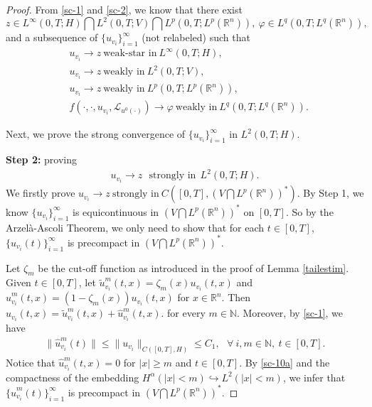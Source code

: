 \documentclass[11pt]{article}
\numberwithin{equation}{section}
\theoremstyle{plain}
\def\geq{\geqslant}
\def\leq{\leqslant}
\begin{document}
\begin{proof}
    From \eqref{sc-1} and \eqref{sc-2},
    we   know that there exist
    $$
    z \in L^\infty(0,T; H) \bigcap L^2(0,T; V) \bigcap L^p(0,T; L^p(\mathbb{R}^n) ),\
    \varphi \in L^q(0,T; L^q(\mathbb{R}^n) ),
    $$
    and a  subsequence of $\{ u_{v_i} \}_{i=1}^\infty$ (not relabeled)
    such that
    \begin{align}
        & u_{v_i} \rightarrow z \  \text{weak-star in} \  L^\infty(0,T; H),  \label{uws} \\
        & u_{v_i} \rightarrow z \  \text{weakly in} \  L^2(0,T; V),  \label{uw} \\
        & u_{v_i} \rightarrow z \  \text{weakly in} \  L^p(0,T; L^p(\mathbb{R}^n) ),  \label{uwlp} \\
        & f(\cdot, \cdot, u_{v_i}, \mathcal{L}_{u^0(\cdot)} ) \rightarrow \varphi \  \text{weakly in} \  L^q(0,T; L^q(\mathbb{R}^n) ).  \label{fw}
    \end{align}

    Next, we prove the strong convergence
    of $\{u_{v_i}\}_{i=1}^\infty$ in
    $ L^2(0,T; H)$.

    {\bf Step 2:}  proving
    \begin{align} \label{sc-10}
        u_{v_i} \rightarrow  z  \ \ \  \text{strongly in} \ \  L^2(0,T; H).
    \end{align}
    We  firstly prove
    $u_{v_i} \rightarrow z \
    \text{strongly in} \  C \left([0,T], \left( V \bigcap L^p(\mathbb{R}^n) \right)^\ast \right).$
    By Step 1, we know
    $\{ u_{v_i} \}_{i=1}^\infty$
    is equicontinuous in
    $\left( V \bigcap L^p(\mathbb{R}^n) \right)^\ast$
    on $[0,T]$.
    So by the Arzel\`{a}-Ascoli Theorem,
    we only need to  show that
    for each $t \in [0,T]$,
    $\{ u_{v_i}(t) \}_{i=1}^\infty$
    is precompact in
    $\left( V \bigcap L^p(\mathbb{R}^n) \right)^\ast$.

    Let $\zeta_m$  be the cut-off function
    as introduced in the proof of Lemma
    \ref{tailestim}.
    Given $t \in [0,T]$, let
    $\widetilde{u}_{v_i}^m (t,x)
    = \zeta_m(x) u_{v_i}(t,x)$
    and
    $\widehat{u}_{v_i}^m(t,x)
    = (1 - \zeta_m(x) ) u_{v_i}(t,x)$
    for $x\in \mathbb{R}^n$.
    Then
    $u_{v_i}(t,x)
    = \widetilde{u}_{v_i}^m(t,x)
    + \widehat{u}_{v_i}^m(t,x).$
    for every $m\in \mathbb{N}$.
    Moreover, by \eqref{sc-1}, we have
    \begin{align} \label{sc-10a}
        \| \widehat{u}_{v_i}^m(t) \|
        \leq \| u_{v_i} \|_{C([0,T], H)}
        \leq C_1, \ \ \  \forall\ i,m \in \mathbb{N}, \ t\in [0,T].
    \end{align}
    Notice that
    $\widehat{u}_{v_i}^m(t,x) = 0$  for $|x| \geq m$ and   $t\in [0,T]$.
    By  \eqref{sc-10a} and the
    compactness of the embedding
    $H^\alpha (|x|<m)
    \hookrightarrow L^2(|x|<m)$,
    we infer that
    $\{ \widehat{u}_{v_i}^m(t) \}_{i=1}^\infty$
    is precompact in
    $\left( V \bigcap L^p(\mathbb{R}^n) \right)^\ast$.


\end{proof}
\end{document}
